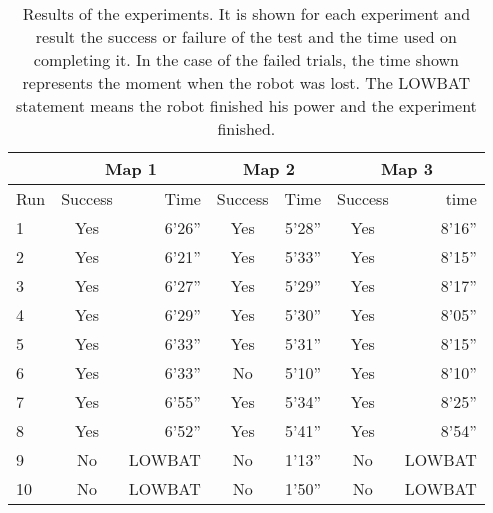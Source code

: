 \begin{table}[H]
	\center
	
	\begin{tabular}{|l|c|r|c|r|c|r|}
	  	\cline{2-7}
	  	\multicolumn{1}{r}{}
 		&  \multicolumn{2}{|c|}{Map 1}
 		& \multicolumn{2}{|c|}{Map 2} 
 		& \multicolumn{2}{|c|}{Map 3}  
		 \\ \cline{2-7}
		\hline
		Run & Success & Time & Success & Time & Success & time \\
		\hline
		1 	& Yes & 6'26'' & Yes & 5'28'' & Yes & 8'16''\\
		2 	& Yes & 6'21'' & Yes & 5'33'' & Yes & 8'15''\\
		3 	& Yes & 6'27'' & Yes & 5'29'' & Yes & 8'17''\\
		4 	& Yes & 6'29'' & Yes & 5'30'' & Yes & 8'05''\\
		5 	& Yes & 6'33'' & Yes & 5'31'' & Yes & 8'15''\\
		6 	& Yes & 6'33'' & No  & 5'10'' & Yes & 8'10''\\
		7 	& Yes & 6'55'' & Yes & 5'34'' & Yes & 8'25''\\
		8 	& Yes & 6'52'' & Yes & 5'41'' & Yes & 8'54''\\
		9 	& No & LOWBAT  & No  & 1'13'' & No 	& LOWBAT\\
		10 	& No & LOWBAT  & No  & 1'50'' & No 	& LOWBAT\\		
		\hline
	\end{tabular}

	\caption[Experimental results of the robot behaviour.]{Results of the experiments. It is shown for each experiment and result the success or failure of the test and the time used on completing it. In the case of the failed trials, the time shown represents the moment when the robot was lost. The LOWBAT statement means the robot finished his power and the experiment finished.}
	\label{tab:Experiment1}
\end{table}